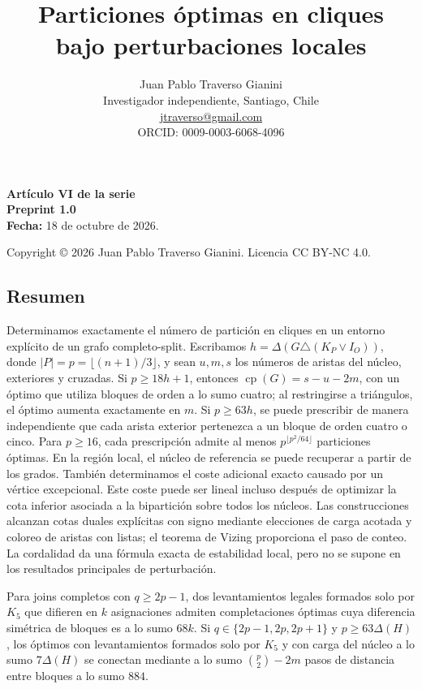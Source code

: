 \documentclass[spanish,11pt,a4paper]{article}
\title{Particiones óptimas en cliques\\bajo perturbaciones locales}
\author{Juan Pablo Traverso Gianini\\\small Investigador independiente, Santiago, Chile\\\small \href{mailto:jtraverso@gmail.com}{jtraverso@gmail.com}\\\small ORCID: 0009-0003-6068-4096}
\date{}
\begin{document}
\raggedbottom\maketitle
\textbf{Artículo VI de la serie}\\
\textbf{Preprint 1.0}\\
\textbf{Fecha:} 18 de octubre de 2026.

Copyright © 2026 Juan Pablo Traverso Gianini. Licencia CC BY-NC 4.0.

\subsection{Resumen}\label{resumen}

Determinamos exactamente el número de partición en cliques en un entorno
explícito de un grafo completo-split. Escribamos
\(h=\Delta(G\triangle(K_P\vee I_O))\), donde
\(|P|=p=\lfloor(n+1)/3\rfloor\), y sean \(u,m,s\) los números de aristas
del núcleo, exteriores y cruzadas. Si \(p\ge18h+1\), entonces
\(\operatorname{cp}(G)=s-u-2m\), con un óptimo que utiliza bloques de
orden a lo sumo cuatro; al restringirse a triángulos, el óptimo aumenta
exactamente en \(m\). Si \(p\ge63h\), se puede prescribir de manera
independiente que cada arista exterior pertenezca a un bloque de orden
cuatro o cinco. Para \(p\ge16\), cada prescripción admite al menos
\(p^{\lfloor p^2/64\rfloor}\) particiones óptimas. En la región local,
el núcleo de referencia se puede recuperar a partir de los grados.
También determinamos el coste adicional exacto causado por un vértice
excepcional. Este coste puede ser lineal incluso después de optimizar la
cota inferior asociada a la bipartición sobre todos los núcleos. Las
construcciones alcanzan cotas duales explícitas con signo mediante
elecciones de carga acotada y coloreo de aristas con listas; el teorema
de Vizing proporciona el paso de conteo. La cordalidad da una fórmula
exacta de estabilidad local, pero no se supone en los resultados
principales de perturbación.

Para joins completos con \(q\ge2p-1\), dos levantamientos legales
formados solo por \(K_5\) que difieren en \(k\) asignaciones admiten
completaciones óptimas cuya diferencia simétrica de bloques es a lo sumo
\(68k\). Si \(q\in\{2p-1,2p,2p+1\}\) y \(p\ge63\Delta(H)\), los óptimos
con levantamientos formados solo por \(K_5\) y con carga del núcleo a lo
sumo \(7\Delta(H)\) se conectan mediante a lo sumo \(\binom p2-2m\)
pasos de distancia entre bloques a lo sumo \(884\).
\end{document}
